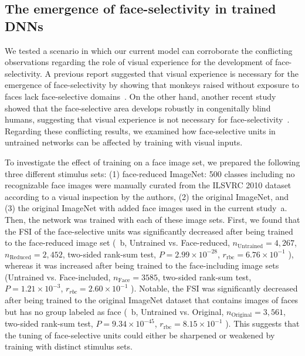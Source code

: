 \documentclass[final,3p,times,twocolumn]{elsarticle}
\begin{document}
\subsection{The emergence of face-selectivity in trained DNNs}
We tested a scenario in which our current model can corroborate the conflicting observations regarding the role of visual experience for the development of face-selectivity.
A previous report suggested that visual experience is necessary for the emergence of face-selectivity by showing that monkeys raised without exposure to faces lack face-selective domains~\cite{arcaro2017seeing}.
On the other hand, another recent study showed that the face-selective area develops robustly in congenitally blind humans, suggesting that visual experience is not necessary for face-selectivity~\cite{arcaro2017seeing}.
Regarding these conflicting results, we examined how face-selective units in untrained networks can be affected by training with visual inputs.


To investigate the effect of training on a face image set,
we prepared the following three different stimulus sets:
(1) face-reduced ImageNet: 500 classes including no recognizable face images were manually curated from the ILSVRC 2010 dataset according to a visual inspection by the authors,
(2) the original ImageNet, 
and (3) the original ImageNet with added face images used in the current study~a.
Then, the network was trained with each of these image sets.
First, we found that the FSI of the face-selective units was significantly decreased after being trained to the face-reduced image set 
(~b,
Untrained vs. Face-reduced,
$ n_\textrm{Untrained} = 4,267 $,
$ n_\textrm{Reduced} = 2,452 $,
two-sided rank-sum test,
$ P = 2.99 \times 10^{-28} $,
$ r_\textrm{rbc} = 6.76 \times 10^{-1} $
),
whereas it was increased after being trained to the face-including image sets 
(Untrained vs. Face-included,
$ n_\textrm{Face} =3585 $,
two-sided rank-sum test,
$ P = 1.21 \times 10^{-3} $,
$ r_{rbc} = 2.60 \times 10^{-1} $
).
Notable, the FSI was significantly decreased after being trained to the original ImageNet dataset that contains images of faces but has no group labeled as face
(~b, Untrained vs. Original, 
$ n_\textrm{Original} = 3,561 $,
two-sided rank-sum test,
$ P = 9.34 \times 10^{-45} $,
$ r_\textrm{rbc} = 8.15 \times 10^{-1} $
).
This suggests that the tuning of face-selective units could either be sharpened or weakened by training with distinct stimulus sets.
\end{document}
